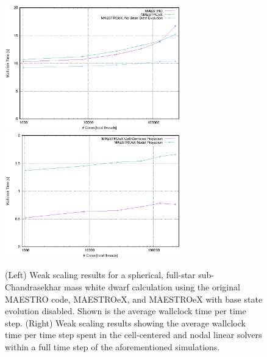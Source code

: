 \begin{figure}[htb]
\begin{center}
\includegraphics[width=3.0in]{./figs/MAESTRO_scaling1} \hspace{0.5em}
\includegraphics[width=3.0in]{./figs/MAESTRO_scaling2}
\caption{\label{fig:scaling} (Left) Weak scaling results for a spherical, full-star sub-Chandrasekhar mass white dwarf calculation using the original MAESTRO code, MAESTROeX, and MAESTROeX with base state evolution disabled.  Shown is the average wallclock time per time step.
(Right) Weak scaling results showing the average wallclock time per time step spent in the cell-centered and nodal linear solvers within a full time step of the aforementioned simulations.}
\end{center}
\end{figure}

